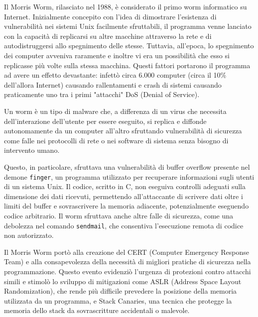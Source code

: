 Il Morris Worm, rilasciato nel 1988, è considerato il primo worm informatico su Internet.
Inizialmente concepito con l'idea di dimostrare l'esistenza di vulnerabilità nei sistemi Unix facilmente sfruttabili, il programma venne lanciato con la capacità di replicarsi su altre macchine attraverso la rete e di autodistruggersi allo spegnimento delle stesse. Tuttavia, all'epoca, lo spegnimento dei computer avveniva raramente e inoltre vi era un possibilità che esso si replicasse più volte sulla stessa macchina. Questi fattori portarono il programma ad avere un effetto devastante: infettò circa 6.000 computer (circa il 10\% dell'allora Internet) causando rallentamenti e crash di sistemi causando praticamente uno tra i primi "attacchi" DoS (Denial of Service).

Un worm è un tipo di malware che, a differenza di un virus che necessita dell'interazione dell'utente per essere eseguito, si replica e diffonde autonomamente da un computer all'altro sfruttando vulnerabilità di sicurezza come falle nei protocolli di rete o nei software di sistema senza bisogno di intervento umano.

Questo, in particolare, sfruttava una vulnerabilità di buffer overflow presente nel demone \texttt{finger}, un programma utilizzato per recuperare informazioni sugli utenti di un sistema Unix. Il codice, scritto in C, non eseguiva controlli adeguati sulla dimensione dei dati ricevuti, permettendo all'attaccante di scrivere dati oltre i limiti del buffer e sovrascrivere la memoria adiacente, potenzialmente eseguendo codice arbitrario. Il worm sfruttava anche altre falle di sicurezza, come una debolezza nel comando \texttt{sendmail}, che consentiva l'esecuzione remota di codice non autorizzato.

Il Morris Worm portò alla creazione del CERT (Computer Emergency Response Team) e alla consapevolezza della necessità di migliori pratiche di sicurezza nella programmazione. Questo evento evidenziò l'urgenza di protezioni contro attacchi simili e stimolò lo sviluppo di mitigazioni come ASLR (Address Space Layout Randomization), che rende più difficile prevedere la posizione della memoria utilizzata da un programma, e Stack Canaries, una tecnica che protegge la memoria dello stack da sovrascritture accidentali o malevole.